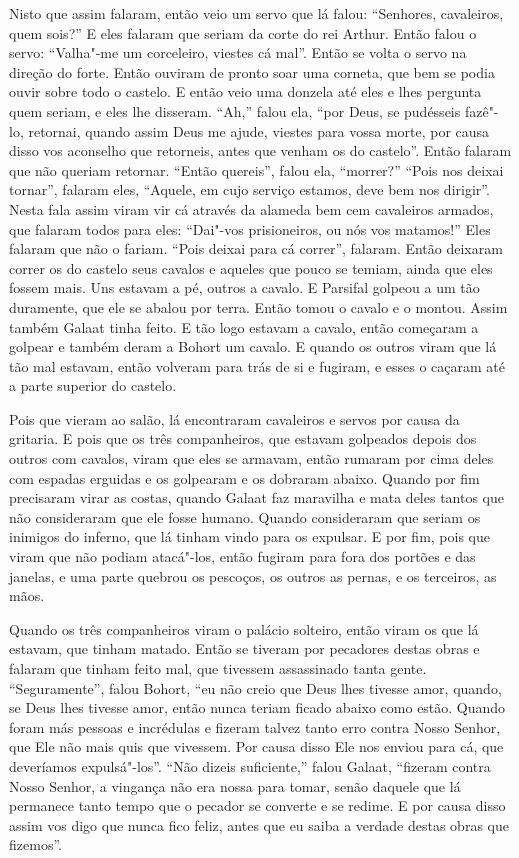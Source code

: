 Nisto que assim falaram, então veio um servo que lá falou: “Senhores,
cavaleiros, quem sois?” E eles falaram que seriam da corte do rei Arthur. Então
falou o servo: “Valha"-me um corceleiro, viestes cá mal”. Então se volta o servo
na direção do forte. Então ouviram de pronto soar uma corneta, que bem se podia
ouvir sobre todo o castelo. E então veio uma donzela até eles e lhes pergunta
quem seriam, e eles lhe disseram. “Ah,” falou ela, “por Deus, se pudésseis
fazê"-lo, retornai, quando assim Deus me ajude, viestes para vossa morte, por
causa disso vos aconselho que retorneis, antes que venham os do castelo”. Então
falaram que não queriam retornar. “Então quereis”, falou ela, “morrer?” “Pois
nos deixai tornar”, falaram eles, “Aquele, em cujo serviço estamos, deve bem
nos dirigir”. Nesta fala assim viram vir cá  através da alameda bem cem
cavaleiros armados, que falaram todos para eles: “Dai"-vos prisioneiros, ou nós
vos matamos!” Eles falaram que não o fariam. “Pois deixai para cá correr”,
falaram. Então deixaram correr os do castelo seus cavalos e aqueles que pouco
se temiam, ainda que eles fossem mais. Uns estavam a pé, outros a cavalo. E
Parsifal golpeou a um tão duramente, que ele se abalou por terra. Então tomou
o cavalo e o montou. Assim também Galaat tinha feito. E tão logo estavam a
cavalo, então começaram a golpear e também deram a Bohort um cavalo. E quando
os outros viram que lá tão mal estavam, então volveram para trás de si e
fugiram, e esses o caçaram até a parte superior do castelo.

Pois que vieram ao salão, lá encontraram cavaleiros e servos por causa da
gritaria. E pois que os três companheiros, que estavam golpeados depois dos
outros com cavalos, viram que eles se armavam, então rumaram por cima deles com
espadas erguidas e os golpearam e os dobraram abaixo. Quando por fim precisaram
virar as costas, quando Galaat faz maravilha e mata deles tantos que não
consideraram que ele fosse humano. Quando consideraram que seriam os inimigos
do inferno, que lá tinham vindo para os expulsar. E por fim, pois que viram que
não podiam atacá"-los, então fugiram para fora dos portões e das janelas, e uma
parte quebrou os pescoços, os outros as pernas, e os terceiros, as mãos. 

Quando os três companheiros viram o palácio solteiro, então viram os que lá
estavam, que tinham matado. Então se tiveram por pecadores destas obras e
falaram que tinham feito mal, que tivessem assassinado tanta gente.
“Seguramente”, falou Bohort, “eu não creio que Deus lhes tivesse amor, quando,
se Deus lhes tivesse amor, então nunca teriam ficado abaixo como estão. Quando
foram más pessoas e incrédulas e fizeram talvez tanto erro contra Nosso Senhor,
que Ele não mais quis que vivessem. Por causa disso Ele nos enviou para cá, que
deveríamos expulsá"-los”. “Não dizeis suficiente,” falou Galaat, “fizeram contra
Nosso Senhor, a vingança não era nossa para tomar, senão daquele que lá
permanece tanto tempo que o pecador se converte e se redime. E por causa disso
assim vos digo que nunca fico feliz, antes que eu saiba a verdade destas obras
que fizemos”. 

